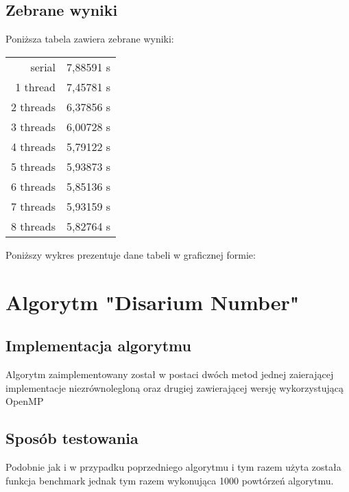 \documentclass[12pt]{article}
\begin{document}
		\subsection{Zebrane wyniki}	
		Poniższa tabela zawiera zebrane wyniki: \newline
		
		\begin{tabular}{|r|l|}  \hline 
			serial		&	7,88591 s \\
			1 thread	&	7,45781 s \\
			2 threads	&	6,37856 s \\
			3 threads	&	6,00728 s \\
			4 threads	&	5,79122 s \\
			5 threads	&	5,93873 s \\
			6 threads	&	5,85136 s \\
			7 threads	&	5,93159 s \\
			8 threads	&	5,82764 s \\
			\hline
		\end{tabular}\newline 
		
		Poniższy wykres prezentuje dane tabeli w graficznej formie:	\newline
		\begin{bchart}[step=1, max=8, unit=s]
		\end{bchart}
	
	\section{Algorytm "Disarium Number"}
		\subsection{Implementacja algorytmu}
				Algorytm zaimplementowany został w postaci dwóch metod jednej zaierającej implementacje niezrównolegloną oraz drugiej zawierającej wersję wykorzystującą OpenMP
		\subsection{Sposób testowania}
				Podobnie jak i w przypadku poprzedniego algorytmu i tym razem użyta została funkcja benchmark jednak tym razem wykonująca 1000 powtórzeń algorytmu.
\end{document}
